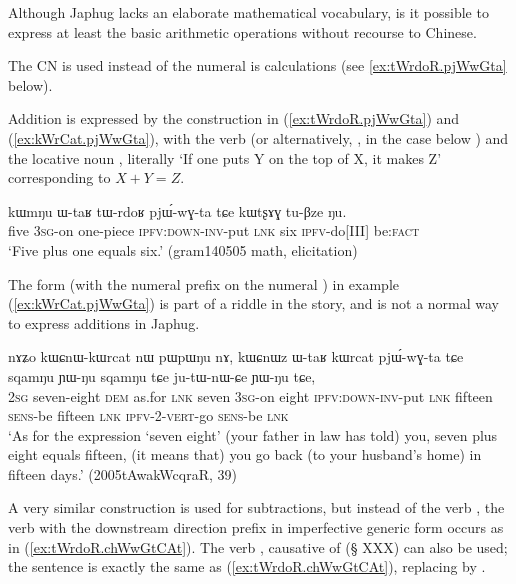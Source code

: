 Although Japhug lacks an elaborate mathematical vocabulary, is it possible to express at least the basic arithmetic operations without recourse to Chinese. 

The CN  is used instead of the numeral  is calculations (see \ref{ex:tWrdoR.pjWwGta} below).

Addition is expressed by the construction in (\ref{ex:tWrdoR.pjWwGta}) and (\ref{ex:kWrCat.pjWwGta}), with the verb  (or alternatively, , in the case below ) and the locative noun , literally  `If one puts Y on the top of X, it makes Z' corresponding to $X+Y=Z$.  

\begin{exe}
\ex \label{ex:tWrdoR.pjWwGta}
\gll kɯmŋu ɯ-taʁ tɯ-rdoʁ pjɯ́-wɣ-ta tɕe kɯtʂɤɣ tu-βze ŋu.  \\
 five \textsc{3sg}-on one-piece \textsc{ipfv}:\textsc{down}-\textsc{inv}-put \textsc{lnk} six \textsc{ipfv}-do[III] be:\textsc{fact} \\
\glt `Five plus one equals six.' (gram140505 math, elicitation)
\end{exe}

The form  (with the numeral prefix  on the numeral ) in example (\ref{ex:kWrCat.pjWwGta}) is part of a riddle in the story, and is not a normal way to express additions in Japhug.

\begin{exe}
\ex \label{ex:kWrCat.pjWwGta}
\gll  nɤʑo kɯɕnɯ-kɯrcat nɯ pɯpɯŋu nɤ, kɯɕnɯz ɯ-taʁ kɯrcat pjɯ́-wɣ-ta tɕe sqamŋu ɲɯ-ŋu sqamŋu tɕe ju-tɯ-nɯ-ɕe ɲɯ-ŋu tɕe, \\
 \textsc{2sg} seven-eight \textsc{dem} as.for \textsc{lnk} seven  \textsc{3sg}-on eight \textsc{ipfv}:\textsc{down}-\textsc{inv}-put \textsc{lnk}  fifteen   \textsc{sens}-be fifteen \textsc{lnk} \textsc{ipfv}-2-\textsc{vert}-go \textsc{sens}-be \textsc{lnk} \\
\glt `As for the expression `seven eight' (your father in law has told) you, seven plus eight equals fifteen, (it means that) you go back (to your husband's home) in fifteen days.' (2005tAwakWcqraR, 39)
\end{exe}

A very similar construction is used for subtractions, but instead of the verb  , the verb  with the downstream direction prefix in imperfective generic form  occurs as in (\ref{ex:tWrdoR.chWwGtCAt}). The verb , causative of  (§ XXX) can also be used; the sentence is exactly the same as (\ref{ex:tWrdoR.chWwGtCAt}), replacing   by  .


